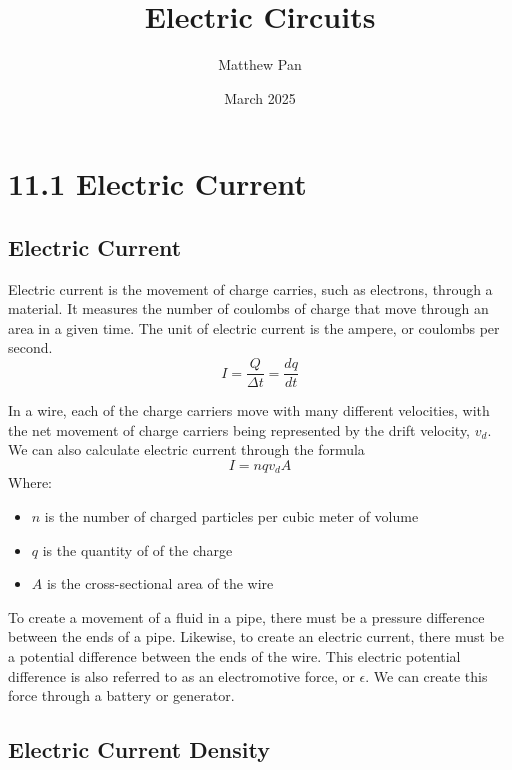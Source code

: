 \documentclass[12pt, titlepage]{article}
\title{Electric Circuits}
\author{Matthew Pan}
\date{March 2025}
\begin{document}
\pagestyle{fancy}

\fancyhead{}
\fancyhead[R]{\thepage}

\maketitle

\section*{11.1 Electric Current}
\subsection*{Electric Current}

Electric current is the movement of charge carries, such as electrons, through a material. It measures the number of coulombs of charge that move through an area in a given time. The unit of electric current is the ampere, or coulombs per second.
\begin{equation*}
    I = \frac{Q}{\Delta t} = \frac{dq}{dt}
\end{equation*}

In a wire, each of the charge carriers move with many different velocities, with the net movement of charge carriers being represented by the drift velocity, $v_d$. We can also calculate electric current through the formula 
\begin{equation*}
    I = nqv_{d}A
\end{equation*}
Where:
\begin{itemize}
    \item $n$ is the number of charged particles per cubic meter of volume
    \item $q$ is the quantity of of the charge
    \item $A$ is the cross-sectional area of the wire
\end{itemize}
To create a movement of a fluid in a pipe, there must be a pressure difference between the ends of a pipe. Likewise, to create an electric current, there must be a potential difference between the ends of the wire. This electric potential difference is also referred to as an electromotive force, or $\epsilon$. We can create this force through a battery or generator.
\subsection*{Electric Current Density}
\end{document}

